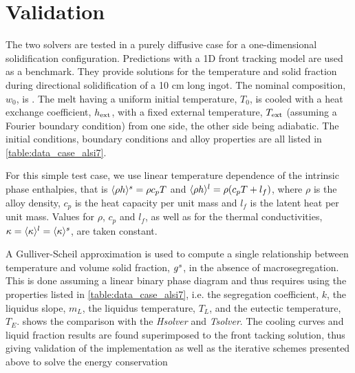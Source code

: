 \section{Validation}


The two solvers are tested in a purely diffusive case for a one-dimensional solidification configuration. 
Predictions with a 1D front tracking model \citep{gandin_constrained_2000} are used as a benchmark. They provide 
solutions for the temperature and solid fraction during directional solidification of a 10 cm long ingot. The nominal
composition, $w_0$, is . 
The melt having a uniform initial temperature, $T_0$, is cooled with a heat exchange coefficient, $h_{\text{ext}}$,
with a fixed external temperature, $T_{\text{ext}}$ (assuming a Fourier 
boundary condition) from one side, the other side being adiabatic. The initial conditions,
boundary conditions and alloy properties are all listed in \cref{table:data_case_alsi7}.

For this simple test case, 
we use linear temperature dependence of the intrinsic phase enthalpies, that is $\langle  \rho h  \rangle^s= \rho c_p T$ and $\langle  \rho h  \rangle^l= \rho (c_p T + l_f)$, 
where $\rho$ is the alloy density, $c_p$ is the heat capacity per unit mass and $l_f$ is the latent heat per unit mass. 
Values for $\rho$, $c_p$ and $l_f$, as well as for the thermal conductivities, $\kappa = \langle \kappa \rangle^l = \langle \kappa \rangle^s$, are taken constant. 

A Gulliver-Scheil approximation is used to compute a single relationship between temperature and volume solid fraction, ${g^s}$, in the 
absence of macrosegregation. This is done assuming a linear binary phase diagram and thus requires using the 
properties listed in \cref{table:data_case_alsi7}, i.e. the segregation coefficient, $k$, the liquidus slope, $m_L$, the 
liquidus temperature, $T_L$, and the eutectic temperature, $T_E$.  shows the comparison with 
the \emph{Hsolver} and \emph{Tsolver}. The cooling curves and liquid fraction results are found superimposed to the front tacking solution, 
thus giving validation of the implementation as well as the iterative schemes presented above to solve the energy conservation 

